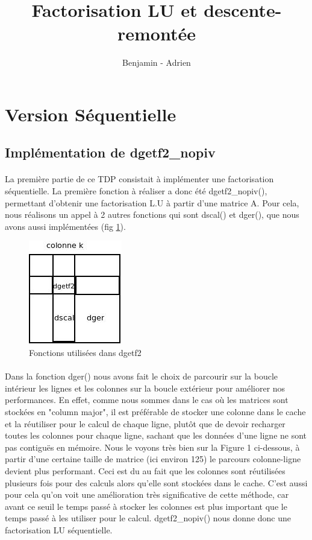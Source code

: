 \documentclass{article}
\title{Factorisation LU et descente-remontée}
\author{Benjamin \bsc{Angelaud} - Adrien \bsc{Guilbaud}}
\begin{document}
\maketitle

\section{Version Séquentielle}
\subsection{Implémentation de dgetf2\_nopiv}
\paragraph{}La première partie de ce TDP consistait à implémenter une factorisation séquentielle. La première fonction à réaliser a donc été dgetf2\_nopiv(), permettant d'obtenir une factorisation L.U à partir d'une matrice A.  Pour cela, nous réalisons un appel à 2 autres fonctions qui sont dscal() et dger(), que nous avons aussi implémentées (fig \ref{diag:dgetf2}).

\begin{figure}[ht]
  \centering
  \includegraphics[scale=0.5]{pictures/Diagramme_dgetf2.jpeg}
  \caption{\label{diag:dgetf2} Fonctions utilisées dans dgetf2}
\end{figure}

\paragraph{}Dans la fonction dger() nous avons fait le choix de parcourir sur la boucle intérieur les lignes et les colonnes sur la boucle extérieur pour améliorer nos performances. En effet, comme nous sommes dans le cas où les matrices sont stockées en "column major", il est préférable de stocker une colonne dans le cache et la réutiliser pour le calcul de chaque ligne, plutôt que de devoir recharger toutes les colonnes pour chaque ligne, sachant que les données d'une ligne ne sont pas contiguës en mémoire. Nous le voyons très bien sur la Figure 1 ci-dessous, à partir d'une certaine taille de matrice (ici environ 125) le parcours colonne-ligne devient plus performant. Ceci est du au fait que les colonnes sont réutilisées plusieurs fois pour des calculs alors qu'elle sont stockées dans le cache. C'est aussi pour cela qu'on voit une amélioration très significative de cette méthode, car avant ce seuil le temps passé à stocker les colonnes est plus important que le temps passé à les utiliser pour le calcul.  dgetf2\_nopiv() nous donne donc une factorisation LU séquentielle.
\end{document}
